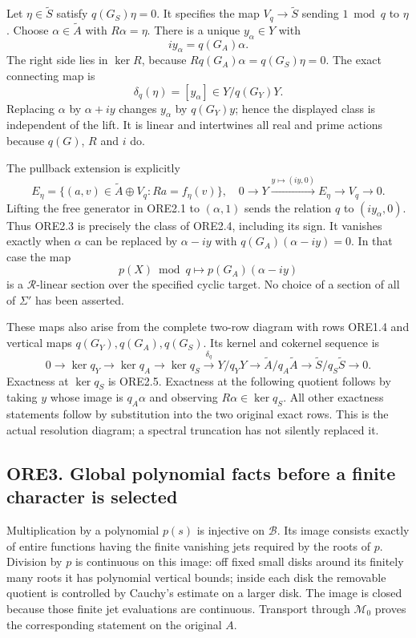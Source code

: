Let \(\eta\in\widetilde S\) satisfy \(q(G_S)\eta=0\). It specifies the
map \(V_q\to\widetilde S\) sending \(1\bmod q\) to \(\eta\). Choose
\(\alpha\in\widetilde A\) with \(R\alpha=\eta\). There is a unique
\(y_\alpha\in Y\) with \[
i y_\alpha=q(G_A)\alpha.
\] The right side lies in \(\ker R\), because
\(R q(G_A)\alpha=q(G_S)\eta=0\). The exact connecting map is \[
\boxed{\delta_q(\eta)=[y_\alpha]\in Y/q(G_Y)Y.}
\tag{ORE2.3}
\] Replacing \(\alpha\) by \(\alpha+i y\) changes \(y_\alpha\) by
\(q(G_Y)y\); hence the displayed class is independent of the lift. It is
linear and intertwines all real and prime actions because \(q(G)\),
\(R\) and \(i\) do.

The pullback extension is explicitly \[
E_\eta=\{(a,v)\in\widetilde A\oplus V_q:R a=f_\eta(v)\},
\quad
0\to Y\xrightarrow{y\mapsto(iy,0)}E_\eta\to V_q\to0.
\tag{ORE2.4}
\] Lifting the free generator in ORE2.1 to \((\alpha,1)\) sends the
relation \(q\) to \((iy_\alpha,0)\). Thus ORE2.3 is precisely the class
of ORE2.4, including its sign. It vanishes exactly when \(\alpha\) can
be replaced by \(\alpha-iy\) with \(q(G_A)(\alpha-iy)=0\). In that case
the map \[
p(X)\bmod q\longmapsto p(G_A)(\alpha-iy)
\tag{ORE2.5}
\] is a \(\mathcal R\)-linear section over the specified cyclic target.
No choice of a section of all of \(\Sigma'\) has been asserted.

These maps also arise from the complete two-row diagram with rows ORE1.4
and vertical maps \(q(G_Y),q(G_A),q(G_S)\). Its kernel and cokernel
sequence is \[
0\to\ker q_Y\to\ker q_A\to\ker q_S
\xrightarrow{\delta_q}Y/q_YY
\to\widetilde A/q_A\widetilde A
\to\widetilde S/q_S\widetilde S\to0.
\tag{ORE2.6}
\] Exactness at \(\ker q_S\) is ORE2.5. Exactness at the following
quotient follows by taking \(y\) whose image is \(q_A\alpha\) and
observing \(R\alpha\in\ker q_S\). All other exactness statements follow
by substitution into the two original exact rows. This is the actual
resolution diagram; a spectral truncation has not silently replaced it.

\subsection{ORE3. Global polynomial facts before a finite character is
selected}\label{ore3.-global-polynomial-facts-before-a-finite-character-is-selected}

Multiplication by a polynomial \(p(s)\) is injective on \(\mathcal B\).
Its image consists exactly of entire functions having the finite
vanishing jets required by the roots of \(p\). Division by \(p\) is
continuous on this image: off fixed small disks around its finitely many
roots it has polynomial vertical bounds; inside each disk the removable
quotient is controlled by Cauchy's estimate on a larger disk. The image
is closed because those finite jet evaluations are continuous. Transport
through \(\mathcal M_0\) proves the corresponding statement on the
original \(A\).

